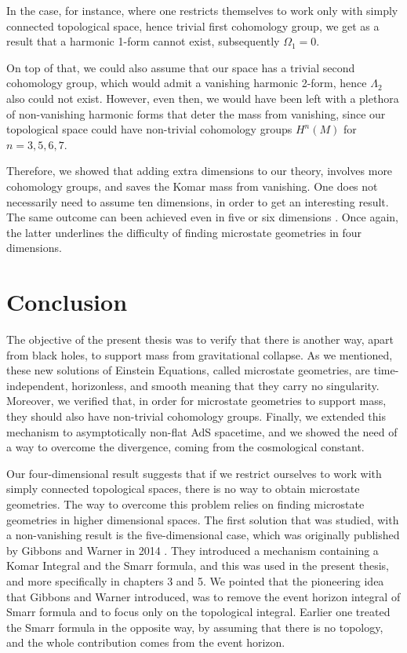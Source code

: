 \documentclass[a4paper,notitlepage]{report}
\begin{document}
In the case, for instance, where one restricts themselves to work only with simply connected topological space, hence trivial first cohomology group, we get as a result that a harmonic 1-form cannot exist, subsequently $\Omega_1 = 0$. 

On top of that, we could also assume that our space has a trivial second cohomology group, which would admit a vanishing harmonic 2-form, hence $\Lambda_2$ also could not exist. However, even then, we would have been left with a plethora of non-vanishing harmonic forms that deter the mass from vanishing, since our topological space could have non-trivial cohomology groups $H^n(M)$ for $n=3,5,6,7$.

Therefore, we showed that adding extra dimensions to our theory, involves more cohomology groups, and saves the Komar mass from vanishing. One does not necessarily need to assume ten dimensions, in order to get an interesting result. The same outcome can been achieved even in five \cite{gibbonsglobal} or six dimensions \cite{de2015structure}. Once again, the latter underlines the difficulty of finding microstate geometries in four dimensions.

\chapter{Conclusion}

The objective of the present thesis was to verify that there is another way, apart from black holes, to support mass from gravitational collapse. As we mentioned, these new solutions of Einstein Equations, called microstate geometries, are time-independent, horizonless, and smooth meaning that they carry no singularity. Moreover, we verified that, in order for microstate geometries to support mass, they should also have non-trivial cohomology groups. Finally, we extended this mechanism to asymptotically non-flat AdS spacetime, and we showed the need of a way to overcome the divergence, coming from the cosmological constant.

Our four-dimensional result suggests that if we restrict ourselves to work with simply connected topological spaces, there is no way to obtain microstate geometries. The way to overcome this problem relies on finding microstate geometries in higher dimensional spaces. The first solution that was studied, with a non-vanishing result is the five-dimensional case, which was originally published by Gibbons and Warner in 2014 \cite{gibbonsglobal}. They introduced a mechanism containing a Komar Integral and the Smarr formula, and this was used in the present thesis, and more specifically in chapters 3 and 5. We pointed that the pioneering idea that Gibbons and Warner introduced, was to remove the event horizon integral of Smarr formula and to focus only on the topological integral. Earlier one treated the Smarr formula in the opposite way, by assuming that there is no topology, and the whole contribution comes from the event horizon.
\end{document}
